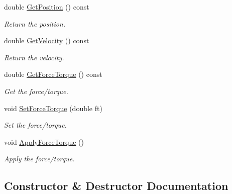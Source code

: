 \begin{DoxyCompactItemize}
double \hyperlink{classosa_o_d_e_joint_a88e1b234bb1dad9ca38a600966cfddbc}{Get\+Position} () const 
\begin{DoxyCompactList}\small\item\em Return the position. \end{DoxyCompactList}\item 
double \hyperlink{classosa_o_d_e_joint_a169a67703c56518e37e3a56ca0fb9d6b}{Get\+Velocity} () const 
\begin{DoxyCompactList}\small\item\em Return the velocity. \end{DoxyCompactList}\item 
double \hyperlink{classosa_o_d_e_joint_ab96ddbc259453a582ff58b0379bab6d0}{Get\+Force\+Torque} () const 
\begin{DoxyCompactList}\small\item\em Get the force/torque. \end{DoxyCompactList}\item 
void \hyperlink{classosa_o_d_e_joint_aaba2dff816bda2a05361d47b0ed67aa4}{Set\+Force\+Torque} (double ft)
\begin{DoxyCompactList}\small\item\em Set the force/torque. \end{DoxyCompactList}\item 
void \hyperlink{classosa_o_d_e_joint_ac11f4cf57ea8219c7de6026685069ff1}{Apply\+Force\+Torque} ()
\begin{DoxyCompactList}\small\item\em Apply the force/torque. \end{DoxyCompactList}\end{DoxyCompactItemize}


\subsection{Constructor \& Destructor Documentation}
\hypertarget{classosa_o_d_e_joint_a01489275c6a1ab57359f49e189f10d07}{}
